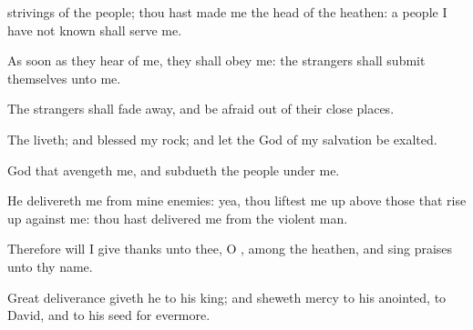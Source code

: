 {strivings of the
people;
{} thou hast
made me the
head of the
heathen: a
people
{} I have not
known shall
serve me.
\par }{\Q {}As soon as they
hear of me, they shall
obey me: the
strangers shall
submit themselves unto me.
\par }{\Q {}The
strangers shall fade
away, and be
afraid out of their close
places.
\par }{\Q {}The
{}
liveth; and
blessed
{} my
rock; and let the
God of my
salvation be
exalted.
\par }{\Q {}
God that
avengeth me, and
subdueth the
people under me.
\par }{\Q {}He
delivereth me from mine
enemies: yea, thou liftest me
up above those that rise
up against me: thou hast
delivered me from the
violent
man.
\par }{\Q {}Therefore will I give
thanks unto thee, O
{}, among the
heathen, and sing
praises unto thy
name.
\par }{\Q {}Great
deliverance giveth he to his
king; and
sheweth
mercy to his
anointed, to
David, and to his
seed
for
evermore.

}
